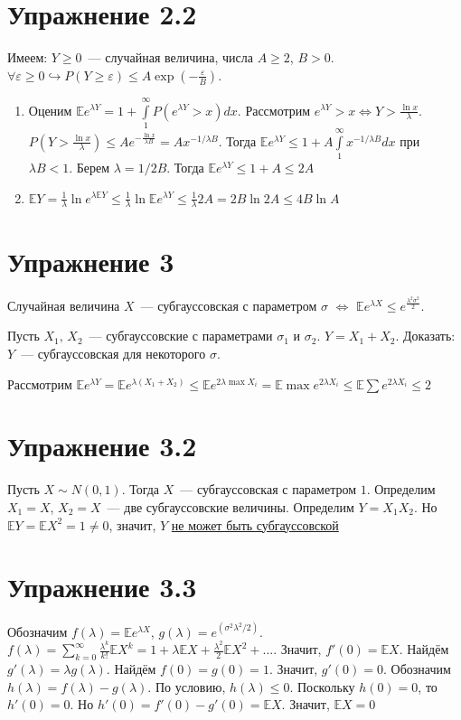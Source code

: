 \documentclass[a4paper]{article}
\def\eps{\varepsilon}
\begin{document}
\section*{Упражнение 2.2}
Имеем: $Y\geqslant 0$~--- случайная величина, числа $A\geqslant 2$, $B>0$. $\forall \eps\geqslant 0\hookrightarrow P(Y\geqslant \eps)\leqslant A\exp(-\frac{\eps}{B})$.
\begin{enumerate}
\item Оценим $\mathbb{E}e^{\lambda Y}=1+\int\limits_1^\infty P(e^{\lambda Y}>x)dx$. Рассмотрим $e^{\lambda Y}>x\Leftrightarrow Y>\frac{\ln x}{\lambda}$. $P(Y>\frac{\ln x}{\lambda})\leqslant Ae^{-\frac{\ln x}{\lambda B}}=Ax^{-1/\lambda B}$. Тогда $\mathbb{E}e^{\lambda Y}\leqslant 1+A\int\limits_1^\infty x^{-1/\lambda B}dx$ при $\lambda B<1$. Берем $\lambda=1/2B$. Тогда $\mathbb{E}e^{\lambda Y}\leqslant 1+A\leqslant 2A$
\item $\mathbb{E}Y=\frac{1}{\lambda}\ln e^{\lambda \mathbb{E}Y}\leqslant \frac{1}{\lambda}\ln \mathbb{E} e^{\lambda Y}\leqslant \frac{1}{\lambda}2A=2B\ln 2A\leqslant \boxed{4B\ln A}$
\end{enumerate}
\section*{Упражнение 3}
Случайная величина $X$~--- субгауссовская с параметром $\sigma$ $\Leftrightarrow$ $\mathbb{E}e^{\lambda X}\leqslant e^{\frac{\lambda^2\sigma^2}{2}}$.

Пусть $X_1,\,X_2$~--- субгауссовские с параметрами $\sigma_1$ и $\sigma_2$. $Y=X_1+X_2$. Доказать: $Y$~--- субгауссовская для некоторого $\sigma$.

Рассмотрим $\mathbb{E}e^{\lambda Y}=\mathbb{E}e^{\lambda (X_1+X_2)}\leqslant \mathbb{E} e^{2\lambda\max X_i}=\mathbb{E}\max e^{2\lambda X_i}\leqslant \mathbb{E} \sum e^{2\lambda X_i}\leqslant 2$
\section*{Упражнение 3.2}
Пусть $X\sim N(0,1)$. Тогда $X$~--- субгауссовская с параметром $1$. Определим $X_1=X$, $X_2=X$~--- две субгауссовские величины. Определим $Y=X_1X_2$. Но $\mathbb{E}Y=\mathbb{E}X^2=1\neq 0$, значит, $Y$ \underline{не может быть субгауссовской}
\section*{Упражнение 3.3}
Обозначим $f(\lambda)=\mathbb{E}e^{\lambda X}$, $g(\lambda)=e^(\sigma^2\lambda^2/2)$. $f(\lambda)=\sum\limits_{k=0}^\infty \frac{\lambda^k}{k!}\mathbb{E}X^k=1+\lambda \mathbb{E}X+\frac{\lambda^2}{2}\mathbb{E}X^2+...$. Значит, $f'(0)=\mathbb{E}X$. Найдём $g'(\lambda)=\lambda g(\lambda)$. Найдём $f(0)=g(0)=1$. Значит, $g'(0)=0$. Обозначим $h(\lambda)=f(\lambda)-g(\lambda)$. По условию, $h(\lambda)\leqslant 0$. Поскольку $h(0)=0$, то $h'(0)=0$. Но $h'(0)=f'(0)-g'(0)=\mathbb{E}X$. Значит, $\boxed{\mathbb{E}X=0}$
\end{document}
